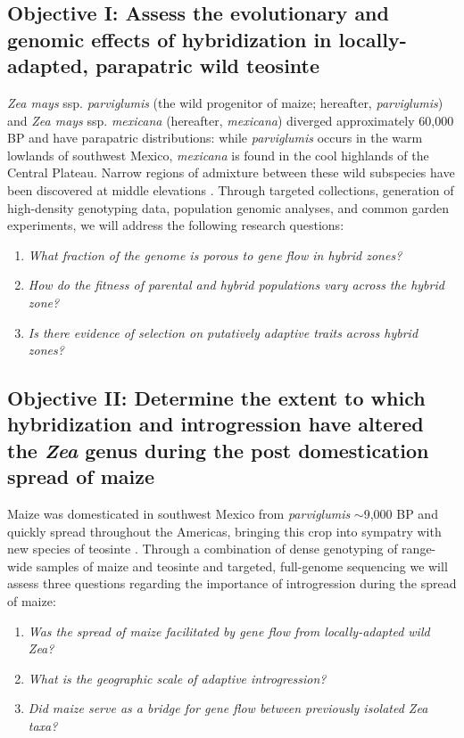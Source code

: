\subsection*{Objective I: Assess the evolutionary and genomic effects of hybridization in locally-adapted, parapatric wild teosinte}
\emph{Zea mays} ssp. \emph{parviglumis} (the wild progenitor of maize; hereafter, \emph{parviglumis}) and \emph{Zea mays} ssp. \emph{mexicana} (hereafter, \emph{mexicana}) diverged approximately 60,000 BP \citep{Ross-Ibarra2009a} and have parapatric distributions: while \emph{parviglumis} occurs in the warm lowlands of southwest Mexico, \emph{mexicana} is found in the cool highlands of the Central Plateau. Narrow regions of admixture between these wild subspecies have been discovered at middle elevations \citep{Fukunaga2005, Pyhajarvi2013}. 
Through targeted collections, generation of high-density genotyping data, population genomic analyses, and common garden experiments, we will address the following research questions:
\begin{enumerate}
\item \emph{What fraction of the genome is porous to gene flow in hybrid zones?}

\item \emph{How do the fitness of parental and hybrid populations vary across the hybrid zone?}

\item \emph{Is there evidence of selection on putatively adaptive traits across hybrid zones?}
\end{enumerate}
\vspace{0.5cm}

\subsection*{Objective II: Determine the extent to which hybridization and introgression have altered the \emph{Zea} genus during the post domestication spread of maize}
Maize was domesticated in southwest Mexico from \emph{parviglumis} $\sim$9,000 BP \citep{Matsuoka2002} and quickly spread throughout the Americas, bringing this crop into sympatry with new species of teosinte \citep{Vigouroux2008a}. Through a combination of dense genotyping of range-wide samples of maize and teosinte and targeted, full-genome sequencing we will assess three questions regarding the importance of introgression during the spread of maize:
\begin{enumerate}
\item \emph{Was the spread of maize facilitated by gene flow from locally-adapted wild \emph{Zea}?}
\item \emph{What is the geographic scale of adaptive introgression?}
\item \emph{Did maize serve as a bridge for gene flow between previously isolated \emph{Zea} taxa?}
\end{enumerate}

